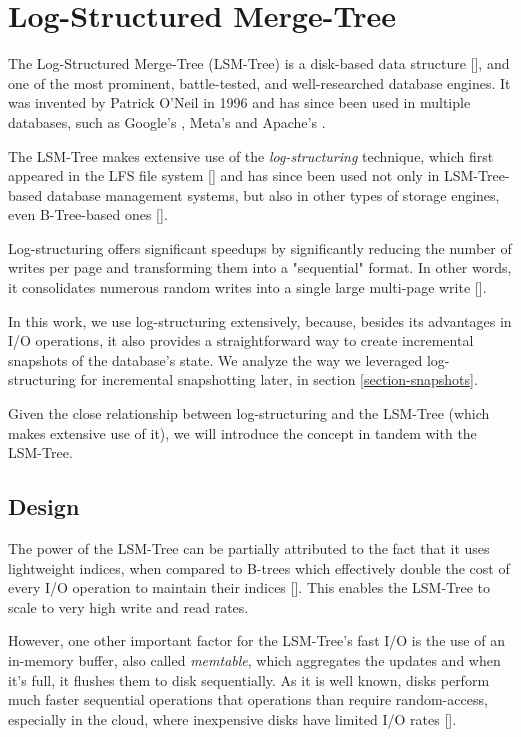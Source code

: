 \section{Log-Structured Merge-Tree}

The Log-Structured Merge-Tree (LSM-Tree) is a disk-based data structure [\cite{lsmtree}], and one of the most prominent, battle-tested, and well-researched database engines.
It was invented by Patrick O'Neil in 1996 and has since been used in multiple databases, such as Google's \cite{leveldb}, Meta's \cite{rocksdb} and Apache's \cite{cassandra}.

The LSM-Tree makes extensive use of the \textit{log-structuring} technique, which first appeared in the LFS file system [\cite{lsm-filesystem}] and has since been used not only in LSM-Tree-based database management systems, but also in other types of storage engines, even B-Tree-based ones [\cite{llama}].

Log-structuring offers significant speedups by significantly reducing the number of writes per page and transforming them into a "sequential" format.
In other words, it consolidates numerous random writes into a single large multi-page write [\cite{llama}].

In this work, we use log-structuring extensively, because, besides its advantages in I/O operations, it also provides a straightforward way to create incremental snapshots of the database's state.
We analyze the way we leveraged log-structuring for incremental snapshotting later, in section \ref{section-snapshots}.

Given the close relationship between log-structuring and the LSM-Tree (which makes extensive use of it), we will introduce the concept in tandem with the LSM-Tree.

\subsection{Design}
\label{subsection-lsm-design}

The power of the LSM-Tree can be partially attributed to the fact that it uses lightweight indices, when compared to B-trees which effectively double the cost of every I/O operation to maintain their indices [\cite{lsmtree}].
This enables the LSM-Tree to scale to very high write and read rates.

However, one other important factor for the LSM-Tree's fast I/O is the use of an in-memory buffer, also called \textit{memtable}, which aggregates the updates and when it's full, it flushes them to disk sequentially.
As it is well known, disks perform much faster sequential operations that operations than require random-access, especially in the cloud, where inexpensive disks have limited I/O rates [\cite{llama}].

